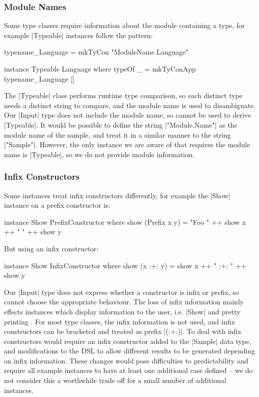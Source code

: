 \documentclass[preprint,draft]{sigplanconf}
\begin{document}
\subsubsection{Module Names}
\label{sec:failure_typeable}

Some type classes require information about the module containing a type, for example |Typeable| instances \cite{lammel:syb} follow the pattern:

\begin{code}
typename_Language = mkTyCon "ModuleName.Language"

instance Typeable Language where
    typeOf _ = mkTyConApp typename_Language []
\end{code}

The |Typeable| class performs runtime type comparison, so each distinct type needs a distinct string to compare, and the module name is used to disambiguate. Our |Input| type does not include the module name, so cannot be used to derive |Typeable|. It would be possible to define the string |"Module.Name"| as the module name of the sample, and treat it in a similar manner to the string |"Sample"|. However, the only instance we are aware of that requires the module name is |Typeable|, so we do not provide module information.

\subsubsection{Infix Constructors}

Some instances treat infix constructors differently, for example the |Show| instance on a prefix constructor is:

\begin{code}
instance Show PrefixConstructor where
    show (Prefix x y) = "Foo " ++ show x ++ " " ++ show y
\end{code}

\noindent But using an infix constructor:

\begin{code}
instance Show InfixConstructor where
    show (x :+: y) = show x ++ " :+: " ++ show y
\end{code}

Our |Input| type does not express whether a constructor is infix or prefix, so cannot choose the appropriate behaviour. The loss of infix information mainly effects instances which display information to the user, i.e. |Show| and pretty printing \cite{hughes:pretty_printing}. For most type classes, the infix information is not used, and infix constructors can be bracketed and treated as prefix |(:+:)|. To deal with infix constructors would require an infix constructor added to the |Sample| data type, and modifications to the DSL to allow different results to be generated depending on infix information. These changes would pose difficulties to predictability and require all example instances to have at least one additional case defined -- we do not consider this a worthwhile trade off for a small number of additional instances.
\end{document}
